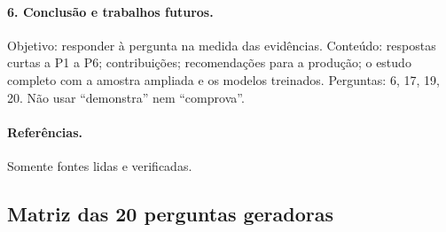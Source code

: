 \documentclass[11pt,a4paper]{article}
\begin{document}
\paragraph{6. Conclusão e trabalhos futuros.}
Objetivo: responder à pergunta na medida das evidências. Conteúdo: respostas curtas a P1 a P6; contribuições; recomendações para a produção; o estudo completo com a amostra ampliada e os modelos treinados. Perguntas: 6, 17, 19, 20. Não usar \enquote{demonstra} nem \enquote{comprova}.

\paragraph{Referências.} Somente fontes lidas e verificadas.

\subsection{Matriz das 20 perguntas geradoras}
\end{document}
